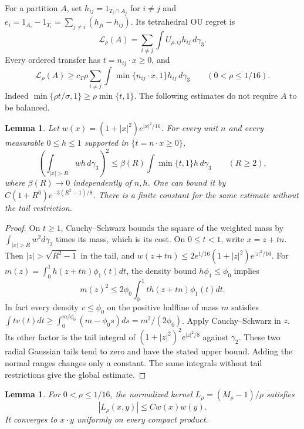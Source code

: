 \documentclass[11pt,reqno]{amsart}
\newtheorem{lemma}[theorem]{Lemma}
\theoremstyle{remark}
\newcommand{\ga}{\gamma}
\newcommand{\LL}{\mathcal L}
\begin{document}
For a partition $A$, set $h_{ij}=1_{T_i\cap A_j}$ for $i\ne j$ and
$e_i=1_{A_i}-1_{T_i}=\sum_{j\ne i}(h_{ji}-h_{ij})$.
Its tetrahedral OU regret is
\[
 \LL_\rho(A)=\sum_{i\ne j}\int U_{\rho,ij}h_{ij}\,d\ga_3.
\]
Every ordered transfer has $t=n_{ij}\cdot x\ge0$, and
\begin{equation}\label{eq:regret-cost}
 \LL_\rho(A)\ge c_T\rho
 \sum_{i\ne j}\int\min\{n_{ij}\cdot x,1\}h_{ij}\,d\ga_3
 \qquad(0<\rho\le1/16).
\end{equation}
Indeed $\min\{\rho t/\sigma,1\}\ge\rho\min\{t,1\}$.
The following estimates do not require $A$ to be balanced.

\begin{lemma}\label{lem:weighted}
Let $w(x)=(1+|x|^2)e^{|x|^2/16}$. For every unit $n$ and every
measurable $0\le h\le1$ supported in $\{t=n\cdot x\ge0\}$,
\begin{equation}\label{eq:weighted-tail}
 \left(\int_{|x|>R}wh\,d\ga_3\right)^2
 \le\beta(R)\int\min\{t,1\}h\,d\ga_3\qquad(R\ge2),
\end{equation}
where $\beta(R)\to0$ independently of $n,h$.
One can bound it by $C(1+R^6)e^{-3(R^2-1)/8}$.
There is a finite constant for the same estimate without the tail restriction.
\end{lemma}

\begin{proof}
On $t\ge1$, Cauchy--Schwarz bounds the square of the weighted mass by
$\int_{|x|>R}w^2d\ga_3$ times its mass, which is its cost.
On $0\le t<1$, write $x=z+tn$.
Then $|z|>\sqrt{R^2-1}$ in the tail, and
$w(z+tn)\le2e^{1/16}(1+|z|^2)e^{|z|^2/16}$.
For $m(z)=\int_0^1h(z+tn)\phi_1(t)dt$, the density bound
$h\phi_1\le\phi_0$ implies
\begin{equation}\label{eq:bathtub}
 m(z)^2\le2\phi_0\int_0^1t h(z+tn)\phi_1(t)dt.
\end{equation}
In fact every density $v\le\phi_0$ on the positive halfline of mass $m$
satisfies
$\int t v(t)dt\ge\int_0^{m/\phi_0}(m-\phi_0s)ds=m^2/(2\phi_0)$.
Apply Cauchy--Schwarz in $z$. Its other factor is the tail integral of
$(1+|z|^2)^2e^{|z|^2/8}$ against $\ga_2$.
These two radial Gaussian tails tend to zero and have the stated upper
bound. Adding the normal ranges changes only a constant.
The same integrals without tail restrictions give the global estimate.
\end{proof}

\begin{lemma}\label{lem:kernel}
For $0<\rho\le1/16$, the normalized kernel
$L_\rho=(M_\rho-1)/\rho$ satisfies
\begin{equation}\label{eq:kernel-weight}
 |L_\rho(x,y)|\le Cw(x)w(y).
\end{equation}
It converges to $x\cdot y$ uniformly on every compact product.
\end{lemma}
\end{document}
